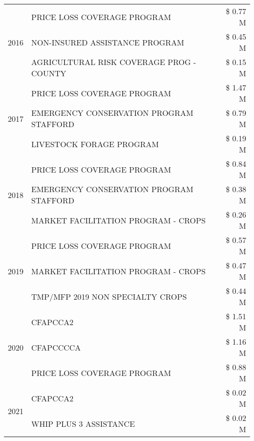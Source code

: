 \begin{tabular}{llr}
\cline{1-3}
\multirow[t]{3}{*}{2016} & PRICE LOSS COVERAGE PROGRAM                   & \$ 0.77 M \\
 & NON-INSURED ASSISTANCE PROGRAM                & \$ 0.45 M \\
 & AGRICULTURAL RISK COVERAGE PROG - COUNTY      & \$ 0.15 M \\
\cline{1-3}
\multirow[t]{3}{*}{2017} & PRICE LOSS COVERAGE PROGRAM & \$ 1.47 M \\
 & EMERGENCY CONSERVATION PROGRAM STAFFORD & \$ 0.79 M \\
 & LIVESTOCK FORAGE PROGRAM & \$ 0.19 M \\
\cline{1-3}
\multirow[t]{3}{*}{2018} & PRICE LOSS COVERAGE PROGRAM & \$ 0.84 M \\
 & EMERGENCY CONSERVATION PROGRAM STAFFORD & \$ 0.38 M \\
 & MARKET FACILITATION PROGRAM - CROPS & \$ 0.26 M \\
\cline{1-3}
\multirow[t]{3}{*}{2019} & PRICE LOSS COVERAGE PROGRAM & \$ 0.57 M \\
 & MARKET FACILITATION PROGRAM - CROPS & \$ 0.47 M \\
 & TMP/MFP 2019 NON SPECIALTY CROPS & \$ 0.44 M \\
\cline{1-3}
\multirow[t]{3}{*}{2020} & CFAPCCA2 & \$ 1.51 M \\
 & CFAPCCCCA & \$ 1.16 M \\
 & PRICE LOSS COVERAGE PROGRAM & \$ 0.88 M \\
\cline{1-3}
\multirow[t]{2}{*}{2021} & CFAPCCA2 & \$ 0.02 M \\
 & WHIP PLUS 3 ASSISTANCE & \$ 0.02 M \\
\cline{1-3}
\bottomrule
\end{tabular}
